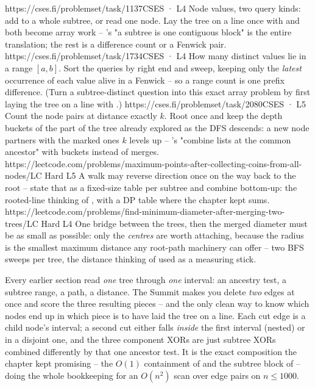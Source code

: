 \begin{mixedset}
    {https://cses.fi/problemset/task/1137}{CSES · L4}
    {Node values, two query kinds: add to a whole subtree, or read one node. Lay the
    tree on a line once with  and both become array work --
    's "a subtree is one contiguous block" is the entire
    translation; the rest is a difference count or a Fenwick pair.}
    {https://cses.fi/problemset/task/1734}{CSES · L4}
    {How many distinct values lie in a range $[a,b]$. Sort the queries by right end and sweep,
    keeping only the \emph{latest} occurrence of each value alive in a Fenwick -- so a range
    count is one prefix difference. (Turn a subtree-distinct question into this exact array
    problem by first laying the tree on a line with .)}
    {https://cses.fi/problemset/task/2080}{CSES · L5}
    {Count the node pairs at distance exactly $k$. Root once and keep the depth
    buckets of the part of the tree already explored as the DFS descends: a new node
    partners with the marked ones $k$ levels up -- 's
    "combine lists at the common ancestor" with buckets instead of merges.}
    {https://leetcode.com/problems/maximum-points-after-collecting-coins-from-all-nodes/}{LC Hard L5}
    {A walk may reverse direction once on the way back to the root -- state that as a
    fixed-size table per subtree and combine bottom-up: the rooted-line thinking of
    , with a DP table where the chapter kept sums.}
    {https://leetcode.com/problems/find-minimum-diameter-after-merging-two-trees/}{LC Hard L4}
    {One bridge between the trees, then the merged diameter must be as small as
    possible: only the \emph{centres} are worth attaching, because the radius is the
    smallest maximum distance any root-path machinery can offer -- two BFS sweeps per
    tree, the distance thinking of  used as a measuring stick.}
\end{mixedset}


\begin{notebox}
Every earlier section read \emph{one} tree through \emph{one} interval: an ancestry test, a
subtree range, a path, a distance. The Summit makes you delete \emph{two} edges at once and
score the three resulting pieces -- and the only clean way to know which nodes end up in which
piece is to have laid the tree on a line. Each cut edge is a child node's interval; a second
cut either falls \emph{inside} the first interval (nested) or in a disjoint one, and the three
component XORs are just subtree XORs combined differently by that one ancestor test. It is the
exact composition the chapter kept promising -- the $O(1)$ containment of
 and the subtree block of  -- doing the whole bookkeeping for
an $O(n^2)$ scan over edge pairs on $n\le 1000$.
\end{notebox}

